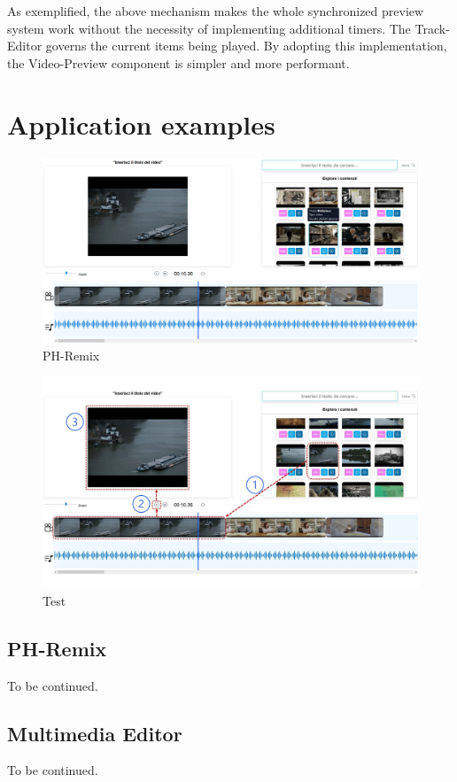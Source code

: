 As exemplified, the above mechanism makes the whole synchronized preview system work without the necessity of implementing additional timers. The Track-Editor governs the current items being played. By adopting this implementation, the Video-Preview component is simpler and more performant.

\section{Application examples}
\label{sec:appExamples}

\begin{figure}[H]
\centering
\includegraphics[width=1\textwidth]{images/phRemixCompressed.png}
\caption{PH-Remix}
\label{fig:phRmx}
\end{figure}

\begin{figure}[H]
\centering
\includegraphics[width=1\textwidth]{images/PH-REmixannotatedUI.jpg}
\caption{Test}
\label{fig:test}
\end{figure}

\subsection{PH-Remix}
\label{sec:phRemixApp}

To be continued.

\subsection{Multimedia Editor}
\label{sec:multimediaEditorApp}

To be continued.